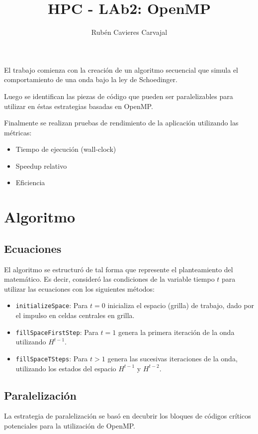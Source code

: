 \documentclass[jou]{apa6}
\title{HPC - LAb2: OpenMP}
\author{Rubén Cavieres Carvajal}
\affiliation{Universidad de Santiago de Chile}
\begin{document}
\maketitle
El trabajo comienza con la creación de un algoritmo secuencial que simula el comportamiento de una onda bajo la ley de Schoedinger.

Luego se identifican las piezas de código que pueden ser paralelizables para utilizar en éstas estrategias basadas en OpenMP.

Finalmente se realizan pruebas de rendimiento de la aplicación utilizando las métricas:

\begin{itemize}
	\item Tiempo de ejecución (wall-clock)
	\item Speedup relativo
	\item Eficiencia
\end{itemize}


\section{Algoritmo}
\subsection{Ecuaciones}
El algoritmo se estructuró de tal forma que represente el planteamiento del matemático. Es decir, consideró las condiciones de la variable tiempo $t$ para utilizar las ecuaciones con los siguientes métodos:

\begin{itemize}
	\item \texttt{initializeSpace}: Para $t = 0$ inicializa el espacio (grilla) de trabajo, dado por el impulso en celdas centrales en grilla.
	\item \texttt{fillSpaceFirstStep}: Para $t = 1$ genera la primera iteración de la onda utilizando $H^{t-1}$.
	\item \texttt{fillSpaceTSteps}: Para $t > 1$ genera las sucesivas iteraciones de la onda, utilizando los estados del espacio $H^{t-1}$ y $H^{t-2}$.
\end{itemize}

\subsection{Paralelización}
La estrategia de paralelización se basó en decubrir los bloques de códigos críticos potenciales para la utilización de OpenMP.
\end{document}

